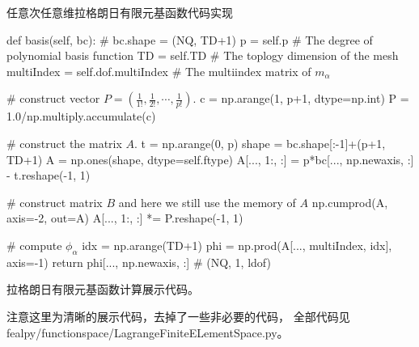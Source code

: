 \documentclass{beamer}
\numberwithin{subsection}{section}
\begin{document}
\begin{frame}[fragile]{任意次任意维拉格朗日有限元基函数代码实现}
\vspace{-0.5cm}
\begin{listing}[H]
\tiny
    \begin{pythoncode}
def basis(self, bc): # bc.shape = (NQ, TD+1)
    p = self.p   # The degree of polynomial basis function
    TD = self.TD # The toplogy dimension of the mesh 
    multiIndex = self.dof.multiIndex # The multiindex matrix of $m_\alpha$

    # construct vector $P=(\frac{1}{1!}, \frac{1}{2!}, \cdots, \frac{1}{p!})$.
    c = np.arange(1, p+1, dtype=np.int)
    P = 1.0/np.multiply.accumulate(c)

    # construct the matrix $A$.
    t = np.arange(0, p)
    shape = bc.shape[:-1]+(p+1, TD+1)
    A = np.ones(shape, dtype=self.ftype)
    A[..., 1:, :] = p*bc[..., np.newaxis, :] - t.reshape(-1, 1)
    
    # construct matrix $B$ and here we still use the memory of $A$
    np.cumprod(A, axis=-2, out=A)
    A[..., 1:, :] *= P.reshape(-1, 1)

    # compute $\phi_\alpha$ 
    idx = np.arange(TD+1)
    phi = np.prod(A[..., multiIndex, idx], axis=-1)
    return phi[..., np.newaxis, :] # (NQ, 1, ldof)
    \end{pythoncode}
    \caption{拉格朗日有限元基函数计算展示代码。}
\end{listing}
\vspace{-0.5cm}
{\footnotesize
注意这里为清晰的展示代码，去掉了一些非必要的代码， 全部代码见 fealpy/functionspace/LagrangeFiniteELementSpace.py。
}
\end{frame}
\end{document}
